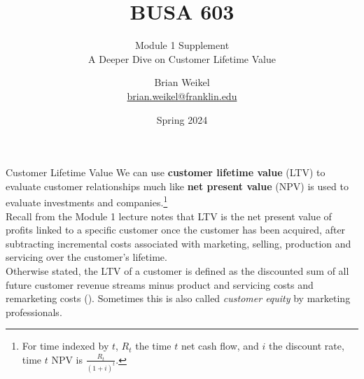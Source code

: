 \documentclass[pdf]{beamer}
\title{BUSA 603}
\subtitle{Module 1 Supplement \\  A Deeper Dive on Customer Lifetime Value}
\newcommand{\empr}[1]{{\color{franklinblue}\textbf{#1}}}
\theoremstyle{remark}
\theoremstyle{definition}
\begin{document}
\author[B. Weikel, Franklin University]{
	\begin{tabular}{c} 
	\Large
	Brian Weikel\\
    \footnotesize \href{mailto:brian.weikel@franklin.edu}{brian.weikel@franklin.edu}
    \vspace{1ex}
\end{tabular}
\vspace{-4ex}}


\date{Spring 2024}%

\begin{noheadline}
\begin{frame}[t]\maketitle\end{frame}
\end{noheadline}

\begin{frame}[t]{Customer Lifetime Value }
We can use \empr{customer lifetime value} (LTV) to evaluate customer relationships much like \empr{net present value} (NPV) is used to evaluate investments and companies.\footnote{For time indexed by $t$, $R_t$ the time $t$ net cash flow, and $i$ the discount rate, time $t$ NPV is $\frac{R_t}{(1+i)^t}$.} \\
\vspace{1.5ex}
Recall from the Module 1 lecture notes that LTV is the net present value of profits linked to a specific customer once the customer has been acquired, after subtracting incremental costs associated with marketing, selling, production and servicing over the customer's lifetime. \\
\vspace{1.5ex}
Otherwise stated, the LTV of a customer is defined as the discounted sum of all future customer revenue streams minus product and servicing costs and remarketing costs (\cite{bendle2020}). Sometimes this is also called \textit{customer equity} by marketing professionals.
\end{frame}
\end{document}
